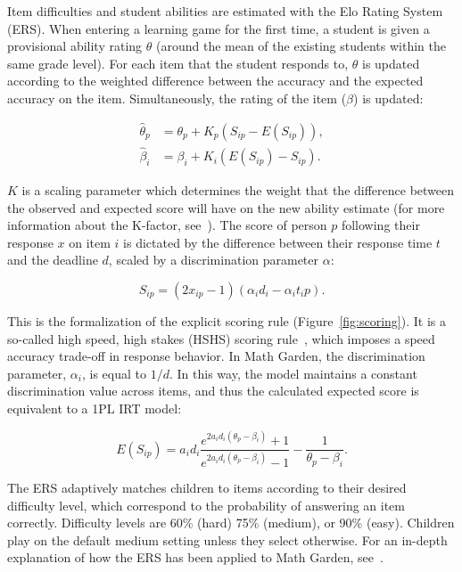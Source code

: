 \documentclass[manuscript]{acmart}
\begin{document}
Item difficulties and student abilities are estimated with the Elo Rating System (ERS). %
When entering a learning game for the first time, a student is given a provisional ability rating $\theta$ (around the mean of the existing students within the same grade level). For each item that the student responds to, $\theta$ is updated according to the weighted difference between the accuracy and the expected accuracy on the item. Simultaneously, the rating of the item ($\beta$) is updated: 

\begin{align}
    \hat{\theta}_p &= \theta_p + K_p(S_{ip} - E(S_{ip})), \\
    \hat{\beta}_i &= \beta_i + K_i(E(S_{ip}) - S_{ip}).
\end{align}

\noindent $K$ is a scaling parameter which determines the weight that the difference between the observed and expected score will have on the new ability estimate (for more information about the K-factor, see~\cite{vermeiren2024balancing}). The score of person $p$ following their response $x$ on item $i$ is dictated by the difference between their response time $t$ and the deadline $d$, scaled by a discrimination parameter $\alpha$:

\begin{equation}
    S_{ip} = (2x_{ip} - 1)(\alpha_id_i - \alpha_it_ip).
    \label{eq:scoring}
\end{equation}

\noindent This is the formalization of the explicit scoring rule (Figure~\ref{fig:scoring}). It is a so-called high speed, high stakes (HSHS) scoring rule~\cite{maris2012speed}, which imposes a speed accuracy trade-off in response behavior. In Math Garden, the discrimination parameter, $\alpha_i$, is equal to $1/d$. In this way, the model maintains a constant discrimination value across items, and thus the calculated expected score is equivalent to a 1PL IRT model: 

\begin{equation}
    E(S_{ip}) = a_i d_i \frac{e^{2 a_i d_i (\theta_p - \beta_i)} + 1}{e^{2 a_i d_i (\theta_p - \beta_i)} - 1} - \frac{1}{\theta_p - \beta_i}.
\end{equation}

\noindent The ERS adaptively matches children to items according to their desired difficulty level, which correspond to the probability of answering an item correctly. Difficulty levels are 60\% (hard) 75\% (medium), or 90\% (easy). Children play on the default medium setting unless they select otherwise. For an in-depth explanation of how the ERS has been applied to Math Garden, see~\cite{klinkenberg2011computer}.
\end{document}
